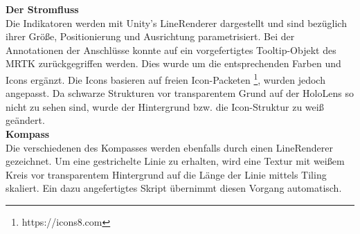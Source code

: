 \textbf{Der Stromfluss}\\
Die Indikatoren werden mit Unity's LineRenderer dargestellt und sind bezüglich ihrer Größe, Positionierung und Ausrichtung parametrisiert. Bei der Annotationen der Anschlüsse konnte auf ein vorgefertigtes Tooltip-Objekt des MRTK zurückgegriffen werden. Dies wurde um die entsprechenden Farben und Icons ergänzt. Die Icons basieren auf freien Icon-Packeten \footnote{https://icons8.com}, wurden jedoch angepasst. Da schwarze Strukturen vor transparentem Grund auf der HoloLens so nicht zu sehen sind, wurde der Hintergrund bzw. die Icon-Struktur zu weiß geändert.\\

\textbf{Kompass}\\
Die verschiedenen des Kompasses werden ebenfalls durch einen LineRenderer gezeichnet. Um eine gestrichelte Linie zu erhalten, wird eine Textur mit weißem Kreis vor transparentem Hintergrund auf die Länge der Linie mittels Tiling skaliert. Ein dazu angefertigtes Skript übernimmt diesen Vorgang automatisch.\\

